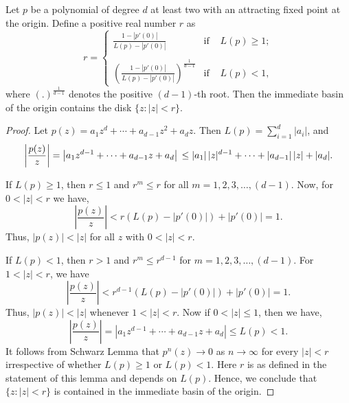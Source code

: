 \documentclass[10pt,a4paper]{amsart}
\begin{document}
\begin{lem}\label{disk_in_imm}
	Let $p$ be a polynomial of degree $d$ at least two with an attracting fixed point at the origin. Define a positive real number $r$ as
	\begin{equation*}
	r = \left\{\begin{array}{ccc}
	\frac{1- |p'(0)|}{L(p)-|p'(0)|} & \text {if } & L(p) \geq 1; \\
	\\
	\left(\frac{1- |p'(0)|}{L(p)-|p'(0)|}\right)^{\frac{1}{d-1}}& \text {if  } & L(p) <1,
	\end{array}\right.
	\end{equation*} where $(.)^{\frac{1}{d-1}}$ denotes the positive $(d-1)$-th root.  Then the immediate basin of the origin contains the disk $\{z: |z|< r\}$.
\end{lem}

\begin{proof}
Let $p(z)=a_1 z^d +\cdots +a_{d-1}z^2+a_d z$. Then $L(p)=\sum_{i=1}^{d} |a_i|$, and
$$
\left|\frac{p(z)}{z}\right| =  \left|a_1 z^{d-1}+\cdots+a_{d-1}z+a_d\right| \\
\leq \left|a_1\right||z|^{d-1}+\cdots+\left|a_{d-1}\right||z|+|a_d|.
$$
\par If $L(p) \geq 1$, then $r \leq 1$ and $r^{m} \leq r$ for all $m=1,2,3, \dots, (d-1)$. Now, for $0<|z|<r$ we have,
$$\left|\frac{p(z)}{z}\right| < r \left( L(p) - |p'(0)| \right)  +|p'(0)| 
 =1.$$
Thus, $|p(z)|<|z|$ for all $z$ with $ 0< |z|<r$.
	
	\par 
	If $L(p) < 1$, then $r>1$ and $r^{m} \leq  r^{d-1}$ for $m =1,2,3,\dots, (d-1)$. For $1<|z|<r$, we have  
$$	\left|\frac{p(z)}{z}\right|  <r^{d-1}(L(p)-|p'(0)|)+|p'(0)|
 =1.
$$
	Thus, $|p(z)|<|z|$ whenever $1<|z|<r$. Now if $0<|z| \leq 1$, then we have, 
$$ \left|\frac{p(z)}{z}\right|=  \left|a_1 z^{d-1}+\cdots+a_{d-1}z+a_d\right|  \leq L(p) < 1.
$$
It follows from Schwarz Lemma that $p^n (z) \to 0$ as $n \to \infty$ for every
$|z|<r$ irrespective of whether $L(p) \geq 1$ or $L(p) <1$. Here $r$ is as defined in the statement of this lemma and depends on $L(p)$.	Hence, we conclude that $\{z: |z|<r\}$ is contained in the immediate basin of the origin.
\end{proof}
\end{document}
